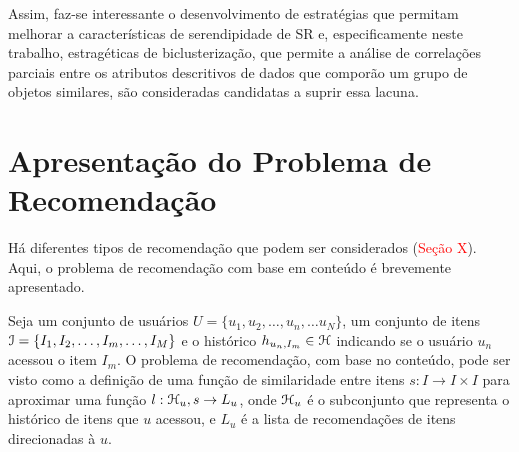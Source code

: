 \documentclass[normaltoc, espacoumemeio, pnumromarab,ruledheader]{abnt}
\begin{document}

Assim, faz-se interessante o desenvolvimento de estratégias que permitam melhorar a características de serendipidade de SR e, especificamente neste trabalho, estragéticas de biclusterização, que permite a análise de correlações parciais entre os atributos descritivos de dados que comporão um grupo de objetos similares, são consideradas candidatas a suprir essa lacuna.



\section{Apresentação do Problema de Recomendação}



Há diferentes tipos de recomendação que podem ser considerados (\textcolor{red}{Seção X}). Aqui, o problema de recomendação com base em conteúdo é brevemente apresentado.


Seja um conjunto de usuários $U = \{ u_1, u_2, \dots, u_n, \dots u_N \}$, um conjunto de itens ${\cal I} = \{ I_1, I_2, \dots, I_m, \dots, I_M \}$  e o histórico $h_{u_n,I_m} \in {\cal H}$ indicando se o usuário $u_n$ acessou o item $I_m$. O problema de recomendação, com base no conteúdo, pode ser visto como a definição de uma função de similaridade entre itens $s: I \rightarrow I \times I$ para aproximar uma função $l: {\cal H}_u, s \rightarrow L_u$, onde ${\cal H}_u$ é o subconjunto que representa o histórico de itens que $u$ acessou, e $L_u$ é a lista de recomendações de itens direcionadas à $u$.
\end{document}
